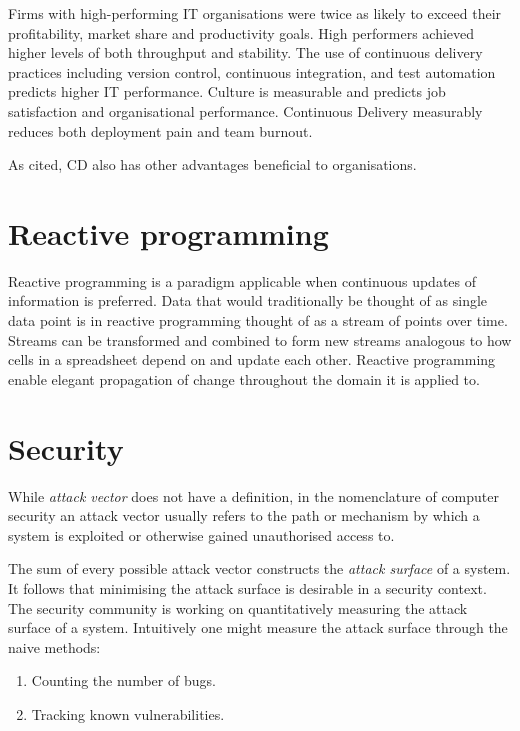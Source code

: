 \begin{displayquote}
    Firms with high-performing IT organisations were twice as likely to exceed their profitability, market share and productivity goals.
    High performers achieved higher levels of both throughput and stability.
    The use of continuous delivery practices including version control, continuous integration, and test automation predicts higher IT performance.
    Culture is measurable and predicts job satisfaction and organisational performance.
    Continuous Delivery measurably reduces both deployment pain and team burnout\cite{forsgren}.
\end{displayquote}

As cited, \acrshort{CD} also has other advantages beneficial to organisations.

\section{Reactive programming}
Reactive programming is a paradigm applicable when continuous updates of information is preferred. Data that would traditionally be thought of as single data point is in reactive programming thought of as a stream of points over time. Streams can be transformed and combined to form new streams analogous to how cells in a spreadsheet depend on and update each other. Reactive programming enable elegant propagation of change throughout the domain it is applied to.

\newpage
\section{Security}
While \textit{attack vector} does not have a definition, in the nomenclature of computer security an attack vector usually refers to the path or mechanism by which a system is exploited or otherwise gained unauthorised access to\cite{av1}\cite{av2}\cite{av3}.

The sum of every possible attack vector constructs the \textit{attack surface} of a system. It follows that minimising the attack surface is desirable\cite[p.~1]{as} in a security context. The security community is working on quantitatively measuring the attack surface of a system. Intuitively one might measure the attack surface through the naive methods:

\begin{enumerate}
    \item Counting the number of bugs.
    \item Tracking known vulnerabilities.
\end{enumerate}

